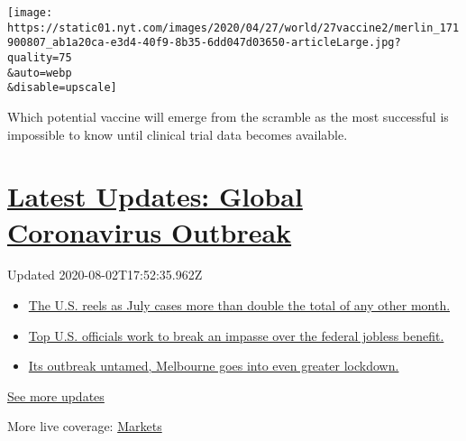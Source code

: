\texttt{[image: https://static01.nyt.com/images/2020/04/27/world/27vaccine2/merlin\_171900807\_ab1a20ca-e3d4-40f9-8b35-6dd047d03650-articleLarge.jpg?quality=75\\\&auto=webp\\\&disable=upscale]}

Which potential vaccine will emerge from the scramble as the most
successful is impossible to know until clinical trial data becomes
available.

\hypertarget{latest-updates-global-coronavirus-outbreak}{%
\section{\texorpdfstring{\href{https://www.nytimes.com/2020/08/01/world/coronavirus-covid-19.html?action=click\&pgtype=Article\&state=default\&region=MAIN_CONTENT_1\&context=storylines_live_updates}{Latest
Updates: Global Coronavirus
Outbreak}}{Latest Updates: Global Coronavirus Outbreak}}\label{latest-updates-global-coronavirus-outbreak}}

Updated 2020-08-02T17:52:35.962Z

\begin{itemize}
\tightlist
\item
  \href{https://www.nytimes.com/2020/08/01/world/coronavirus-covid-19.html?action=click\&pgtype=Article\&state=default\&region=MAIN_CONTENT_1\&context=storylines_live_updates\#link-34047410}{The
  U.S. reels as July cases more than double the total of any other
  month.}
\item
  \href{https://www.nytimes.com/2020/08/01/world/coronavirus-covid-19.html?action=click\&pgtype=Article\&state=default\&region=MAIN_CONTENT_1\&context=storylines_live_updates\#link-780ec966}{Top
  U.S. officials work to break an impasse over the federal jobless
  benefit.}
\item
  \href{https://www.nytimes.com/2020/08/01/world/coronavirus-covid-19.html?action=click\&pgtype=Article\&state=default\&region=MAIN_CONTENT_1\&context=storylines_live_updates\#link-2bc8948}{Its
  outbreak untamed, Melbourne goes into even greater lockdown.}
\end{itemize}

\href{https://www.nytimes.com/2020/08/01/world/coronavirus-covid-19.html?action=click\&pgtype=Article\&state=default\&region=MAIN_CONTENT_1\&context=storylines_live_updates}{See
more updates}

More live coverage:
\href{https://www.nytimes.com/live/2020/07/31/business/stock-market-today-coronavirus?action=click\&pgtype=Article\&state=default\&region=MAIN_CONTENT_1\&context=storylines_live_updates}{Markets}

